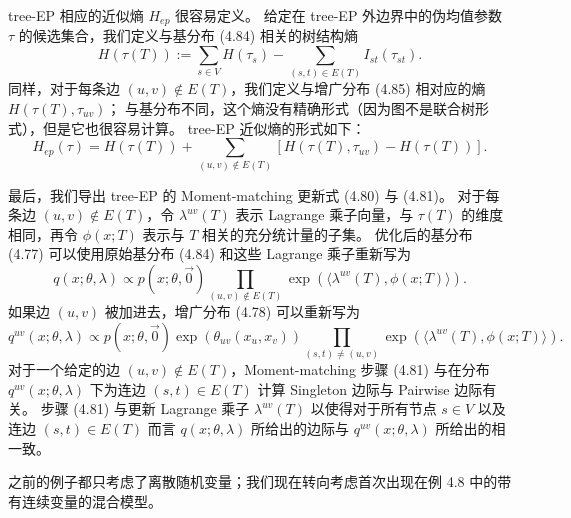 \begin{tcolorbox}
\begin{exam}[树结构的 EP]
    tree-EP 相应的近似熵 $H_{ep}$ 很容易定义。
    给定在 tree-EP 外边界中的伪均值参数 $\tau$ 的候选集合，我们定义与基分布 (4.84) 相关的树结构熵
    \begin{equation}
        H(\tau(T)) := \sum_{s \in V}H(\tau_s) - \sum_{(s, t) \in E(T)}I_{st}(\tau_{st}).
    \end{equation}
    同样，对于每条边 $(u, v) \notin E(T)$，我们定义与增广分布 (4.85) 相对应的熵 $H(\tau(T), \tau_{uv})$；
    与基分布不同，这个熵没有精确形式（因为图不是联合树形式），但是它也很容易计算。
    tree-EP 近似熵的形式如下：
    \begin{equation*}
        H_{ep}(\tau) = H(\tau(T)) + \sum_{(u, v) \notin E(T)}[H(\tau(T), \tau_{uv}) - H(\tau(T))].
    \end{equation*}

    最后，我们导出 tree-EP 的 Moment-matching 更新式 (4.80) 与 (4.81)。
    对于每条边 $(u, v) \notin E(T)$，令 $\lambda^{uv}(T)$ 表示 Lagrange 乘子向量，与 $\tau(T)$ 的维度相同，再令 $\phi(x; T)$ 表示与 $T$ 相关的充分统计量的子集。
    优化后的基分布 (4.77) 可以使用原始基分布 (4.84) 和这些 Lagrange 乘子重新写为
    \begin{equation*}
        q(x; \theta, \lambda) \propto p(x; \theta, \vec{0})\prod_{(u, v) \notin E(T)}\exp(\langle\lambda^{uv}(T), \phi(x; T)\rangle).
    \end{equation*}
    如果边 $(u, v)$ 被加进去，增广分布 (4.78) 可以重新写为
    \begin{equation*}
        q^{uv}(x; \theta, \lambda) \propto p(x; \theta, \vec{0})\exp(\theta_{uv}(x_u, x_v))\prod_{(s, t) \neq (u, v)}\exp(\langle\lambda^{uv}(T), \phi(x; T)\rangle).
    \end{equation*}
    对于一个给定的边 $(u, v) \notin E(T)$，Moment-matching 步骤 (4.81) 与在分布 $q^{uv}(x; \theta, \lambda)$ 下为连边 $(s, t) \in E(T)$ 计算 Singleton 边际与 Pairwise 边际有关。
    步骤 (4.81) 与更新 Lagrange 乘子 $\lambda^{uv}(T)$ 以使得对于所有节点 $s \in V$ 以及连边 $(s, t) \in E(T)$ 而言 $q(x; \theta, \lambda)$ 所给出的边际与 $q^{uv}(x; \theta, \lambda)$ 所给出的相一致。
\end{exam}
\end{tcolorbox}

之前的例子都只考虑了离散随机变量；我们现在转向考虑首次出现在例 4.8 中的带有连续变量的混合模型。

